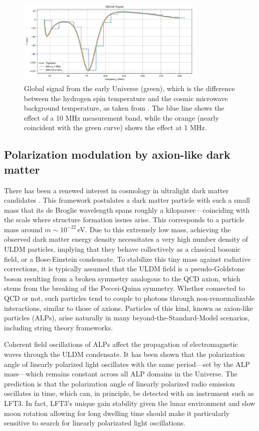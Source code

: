 \begin{figure}
    \centering
    \includegraphics[width=0.8\textwidth]{figures/global_with_bw.png}
    \caption{Global signal from the early Universe (green), which is the difference between the hydrogen spin temperature and the cosmic microwave background temperature, as taken from \cite{Fialkov_2024}.  The blue line shows the effect of a 10 MHz measurement band, while the orange (nearly coincident with the green curve) shows the effect at 1 MHz.}
    \label{fig:global_T_bw}
\end{figure}

\subsection{Polarization modulation by axion-like dark matter}
There has been a renewed interest in cosmology in ultralight dark matter candidates \cite{2022SciA....8J3618C}. This framework postulates a dark matter particle with such a small mass that its de Broglie wavelength spans roughly a kiloparsec—coinciding with the scale where structure formation issues arise. This corresponds to a particle mass around $m\sim 10^{-22}$\,eV. Due to this extremely low mass, achieving the observed dark matter energy density necessitates a very high number density of ULDM particles, implying that they behave collectively as a classical bosonic field, or a Bose-Einstein condensate. To stabilize this tiny mass against radiative corrections, it is typically assumed that the ULDM field is a pseudo-Goldstone boson resulting from a broken symmetry analogous to the QCD axion, which stems from the breaking of the Peccei-Quinn symmetry. Whether connected to QCD or not, such particles tend to couple to photons through non-renormalizable interactions, similar to those of axions. Particles of this kind, known as axion-like particles (ALPs), arise naturally in many beyond-the-Standard-Model scenarios, including string theory frameworks.

Coherent field oscillations of ALPs affect the propagation of electromagnetic waves through the ULDM condensate. It has been shown \citep{2019JCAP...02..059I,2024PhRvD.110f3013A} that the polarization angle of linearly polarized light oscillates with the same period—set by the ALP mass—which remains constant across all ALP domains in the Universe. The prediction is that the polarization angle of linearly polarized radio emission oscillates in time, which can, in principle, be detected with an instrument such as LFT3.  In fact, LFT3's unique gain stability given the lunar environment and slow moon rotation allowing for long dwelling time should make it particularly sensitive to search for linearly polarizated light oscillations. 

